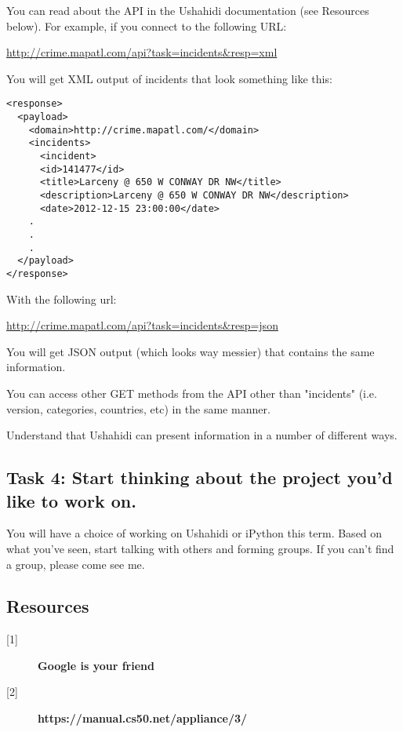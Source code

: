 \documentclass[letterpaper]{article}
\begin{document}
You can read about the API in the Ushahidi documentation (see Resources below).
For example, if you connect to the following URL:

\url{http://crime.mapatl.com/api?task=incidents&resp=xml}

You will get XML output of incidents that look something like this:

\begin{footnotesize}
\begin{verbatim}
<response>
  <payload>
    <domain>http://crime.mapatl.com/</domain>
    <incidents>
      <incident>
      <id>141477</id>
      <title>Larceny @ 650 W CONWAY DR NW</title>
      <description>Larceny @ 650 W CONWAY DR NW</description>
      <date>2012-12-15 23:00:00</date>
    .
    .
    .
  </payload>
</response>
\end{verbatim}
\end{footnotesize}

With the following url:

\url{http://crime.mapatl.com/api?task=incidents&resp=json}

You will get JSON output (which looks way messier) that contains the same information.

You can access other GET methods from the API other than "incidents" (i.e. version,
categories, countries, etc) in the same manner.

Understand that Ushahidi can present information in a number of different ways.

\subsection*{Task 4: Start thinking about the project you'd like to work on.}

You will have a choice of working on Ushahidi or iPython this term.  Based on
what you've seen, start talking with others and forming groups.  If you can't
find a group, please come see me.



\subsection*{Resources}

\begin{footnotesize}
\begin{description}
\item[{[1]}] {\bf Google is your friend}
\item[{[2]}] {\bf https://manual.cs50.net/appliance/3/}
\end{description}
\end{footnotesize}
\end{document}
